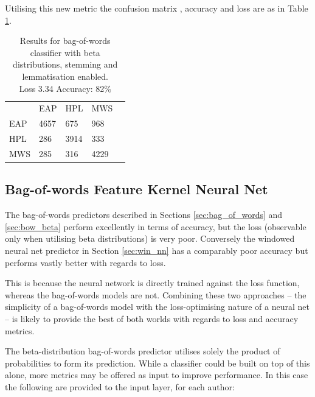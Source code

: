 Utilising this new metric the confusion matrix , accuracy and loss are as in Table \ref{tab:beta_res}.

\begin{table}[h]
\centering
\begin{tabular}{m{1cm}|m{1cm}|m{1cm}|m{1cm}|m{0cm}}
\multicolumn{1}{m{1cm}}{} & \multicolumn{1}{m{1cm}}{EAP} & \multicolumn{1}{m{1cm}}{HPL} & \multicolumn{1}{m{1cm}}{MWS} &\\[5pt]
\cline{2-4}
EAP & 4657 & 675 & 968 & \\[5pt]
\cline{2-4}
HPL & 286 & 3914 & 333 & \\[5pt]
\cline{2-4}
MWS & 285 & 316 & 4229 & \\[5pt]
\cline{2-4}
\end{tabular}
\caption{Results for bag-of-words classifier with beta distributions, stemming and lemmatisation enabled.\\Loss 3.34 Accuracy: 82\% }
\label{tab:beta_res}
\end{table}


  \subsection{Bag-of-words Feature Kernel Neural Net}
  \label{sec:bow_nn}
  The bag-of-words predictors described in Sections \ref{sec:bag_of_words} and \ref{sec:bow_beta} perform excellently in terms of accuracy, but the loss (observable only when utilising beta distributions) is very poor. Conversely the windowed neural net predictor in Section \ref{sec:win_nn} has a comparably poor accuracy but performs vastly better with regards to loss.
  
  This is because the neural network is directly trained against the loss function, whereas the bag-of-words models are not. Combining these two approaches -- the simplicity of a bag-of-words model with the loss-optimising nature of a neural net -- is likely to provide the best of both worlds with regards to loss and accuracy metrics.
  
  The beta-distribution bag-of-words predictor utilises solely the product of probabilities to form its prediction. While a classifier could be built on top of this alone, more metrics may be offered as input to improve performance. In this case the following are provided to the input layer, for each author:
  
